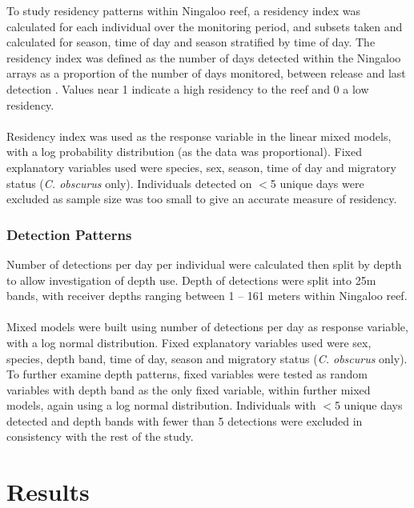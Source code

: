 \documentclass[11pt,a4paper]{article}
\begin{document}
	To study residency patterns within Ningaloo reef, a residency index was calculated for each individual over the monitoring period, and subsets taken and calculated for season, time of day and season stratified by time of day. The residency index was defined as the number of days detected within the Ningaloo arrays as a proportion of the number of days monitored, between release and last detection \citep{Espinoza2016}. Values near 1 indicate a high residency to the reef and 0 a low residency. \\
	\\
	Residency index was used as the response variable in the linear mixed models, with a log probability distribution (as the data was proportional). Fixed explanatory variables used were species, sex, season, time of day and migratory status (\textit{C. obscurus} only). Individuals detected on $<$5 unique days were excluded as sample size was too small to give an accurate measure of residency. \\
	
	
	\subsubsection{Detection Patterns}
	
	Number of detections per day per individual were calculated then split by depth to allow investigation of depth use. Depth of detections were split into 25m bands, with receiver depths ranging between 1 – 161 meters within Ningaloo reef. \\
	\\
	Mixed models were built using number of detections per day as response variable, with a log normal distribution. Fixed explanatory variables used were sex, species, depth band, time of day, season and migratory status (\textit{C. obscurus} only). To further examine depth patterns, fixed variables were tested as random variables with depth band as the only fixed variable, within further mixed models, again using a log normal distribution. Individuals with $<$5 unique days detected and depth bands with fewer than 5 detections were excluded in consistency with the rest of the study.
	
	
	\newpage
	
	\section{Results}
	
\end{document}
